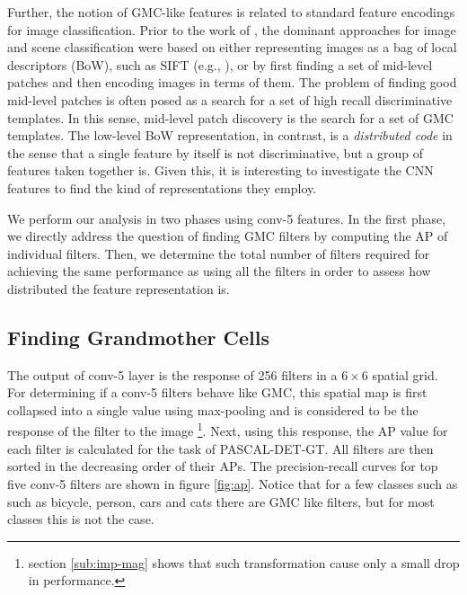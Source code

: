Further, the notion of GMC-like features is related to standard feature encodings for image classification.
Prior to the work of \cite{Kriz}, the dominant approaches for image and scene classification were based on either representing images as a bag of local descriptors (BoW), such as SIFT (e.g., \cite{lazebnik2006beyond}), or by first finding a set of mid-level patches \cite{Mid1,Blocks} and then encoding images in terms of them. 
The problem of finding good mid-level patches is often posed as a search for a set of high recall discriminative templates. 
In this sense, mid-level patch discovery is the search for a set of GMC templates. 
The low-level BoW representation, in contrast, is a \emph{distributed code} in the sense that a single feature by itself is not discriminative, but a group of features taken together is.
Given this, it is interesting to investigate the CNN features to find the kind of representations they employ.

We perform our analysis in two phases using conv-5 features. In the first phase, we directly address the question of finding GMC filters by computing the AP of individual filters. Then, we determine the total number of filters required for achieving the same performance as using all the filters in order to assess how distributed the feature representation is.

\subsection{Finding Grandmother Cells}
\label{sub:class-specific-unit}
The output of conv-5 layer is the response of 256 filters in a $6\times 6$ spatial grid. For determining if a conv-5 filters behave like GMC, this spatial map is first collapsed into a single value using max-pooling and is considered to be the response of the filter to the image \footnote{section \ref{sub:imp-mag} shows that such transformation cause only a small drop in performance.}. Next, using this response, the AP value for each filter is calculated for the task of PASCAL-DET-GT. All filters are then sorted in the decreasing order of their APs. The precision-recall curves for top five conv-5 filters are shown in figure \ref{fig:ap}. Notice that for a few classes such as such as bicycle, person, cars and cats there are GMC like filters, but for most classes this is not the case.   

